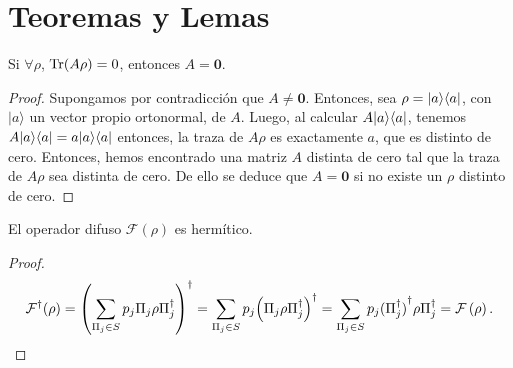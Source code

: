\section{Teoremas y Lemas}
\begin{lemma}\label{lemma_traza_cero} Si $\forall\rho$, ${\rm Tr}(A\rho)=0$, entonces $A=\mathbf{0}$.\end{lemma}\begin{proof} Supongamos por contradicción que $A\ne \mathbf{0}$. Entonces, sea $\rho=|a\rangle \langle a|$, con $|a\rangle$ un vector propio ortonormal, de $A$. Luego, al calcular $A|a\rangle \langle a|$, tenemos $A|a\rangle \langle a|=a|a\rangle \langle a|$ entonces, la traza  de $A\rho$ es exactamente $a$, que es distinto de cero.
Entonces, hemos encontrado una matriz $A$ distinta de cero tal que la traza de $A\rho$ sea distinta de cero. De ello se deduce que $A = \mathbf{0}$ si no existe un $\rho$ distinto de cero.\end{proof}
 
\begin{comment}
\section{Prueba de las características de los efectos propuestos}

\begin{enumerate}
    \item Son operadores hermíticos\[{\left(\sum_{\Pi \in S} p_\Pi \Pi(P_{\lambda_i})\right)}^\dagger =\sum_{\Pi \in S} p_\Pi {\left(\Pi(P_{\lambda_i})\right)}^\dagger = \sum_{\Pi \in S} p_\Pi \Pi(P_{\lambda_i}).\]
    \item Cumplen con la ecuación de completitud \[\sum_{\lambda_i \in \Lambda}\sum_{\Pi \in S} p_\Pi \Pi(P_{\lambda_i})=\]
\end{enumerate}
\end{comment}

\begin{lemma}\label{lemma:op-difuso-hermiticidad} El operador difuso $\mathcal{F}(\rho)$ es hermítico.
\end{lemma}

\begin{proof}
 \[\mathcal{F}^\dagger{(\rho)}={\left(\sum_{\Pi_j \in S} p_j \Pi_{j}\rho\Pi_{j}^{\dagger}\right)}^\dagger =\sum_{\Pi_j \in S} p_j{\left(\Pi_{j}\rho\Pi_{j}^{\dagger}\right)}^\dagger=\sum_{\Pi_j \in S} p_j {(\Pi_{j}^\dagger)}^\dagger \rho\Pi_{j}^\dagger= \mathcal{F}\left(\rho\right).\]
\end{proof}

 